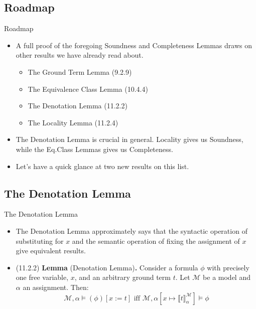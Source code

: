 \subsection{Roadmap}
\begin{frame}{Roadmap}

	\begin{itemize}%
	\itemsep=16pt
		
	\item A full proof of the foregoing Soundness and Completeness Lemmas draws on other results we have already read about.
		\begin{itemize}%
		\item The Ground Term Lemma (9.2.9)
		\item The Equivalence Class Lemma (10.4.4)
		\item The Denotation Lemma (11.2.2)
		\item The Locality Lemma (11.2.4)
		\end{itemize}
		
	\item The Denotation Lemma is crucial in general.
	Locality gives us Soundness, while the Eq.Class Lemmas gives us Completeness.
	
	\item Let's have a quick glance at two new results on this list.
                  
	\end{itemize}

\end{frame}

\subsection{The Denotation Lemma}
\begin{frame}{The Denotation Lemma}

\begin{itemize}%
\itemsep=16pt

\item The Denotation Lemma approximately says that the syntactic operation of substituting for $x$ and the semantic operation of fixing the assignment of $x$ give equivalent results.

\item (11.2.2) \textbf{Lemma} (Denotation Lemma)\textbf{.}
      Consider a formula $\phi$ with precisely one free
            variable, $x$, and an arbitrary ground term $t$. 
            Let $\mathcal{M}$ be a model and
            $\alpha$ an assignment. Then:
            \[\mathcal{M},\alpha\vDash (\phi)[x:=t]\text{ iff
              }\mathcal{M},\alpha[x\mapsto \llbracket
              t\rrbracket^\mathcal{M}_\alpha]\vDash \phi\]
    
\end{itemize}
  
\end{frame}

